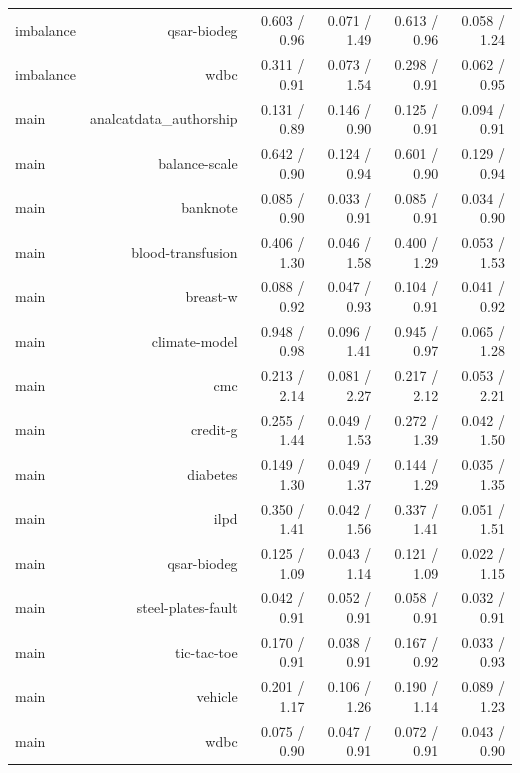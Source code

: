 \begin{table}[t]
\begin{tabular}{lrrrrr}
imbalance & qsar-biodeg & 0.603 / 0.96 & 0.071 / 1.49 & 0.613 / 0.96 & 0.058 / 1.24 \\
imbalance & wdbc & 0.311 / 0.91 & 0.073 / 1.54 & 0.298 / 0.91 & 0.062 / 0.95 \\
main & analcatdata\_authorship & 0.131 / 0.89 & 0.146 / 0.90 & 0.125 / 0.91 & 0.094 / 0.91 \\
main & balance-scale & 0.642 / 0.90 & 0.124 / 0.94 & 0.601 / 0.90 & 0.129 / 0.94 \\
main & banknote & 0.085 / 0.90 & 0.033 / 0.91 & 0.085 / 0.91 & 0.034 / 0.90 \\
main & blood-transfusion & 0.406 / 1.30 & 0.046 / 1.58 & 0.400 / 1.29 & 0.053 / 1.53 \\
main & breast-w & 0.088 / 0.92 & 0.047 / 0.93 & 0.104 / 0.91 & 0.041 / 0.92 \\
main & climate-model & 0.948 / 0.98 & 0.096 / 1.41 & 0.945 / 0.97 & 0.065 / 1.28 \\
main & cmc & 0.213 / 2.14 & 0.081 / 2.27 & 0.217 / 2.12 & 0.053 / 2.21 \\
main & credit-g & 0.255 / 1.44 & 0.049 / 1.53 & 0.272 / 1.39 & 0.042 / 1.50 \\
main & diabetes & 0.149 / 1.30 & 0.049 / 1.37 & 0.144 / 1.29 & 0.035 / 1.35 \\
main & ilpd & 0.350 / 1.41 & 0.042 / 1.56 & 0.337 / 1.41 & 0.051 / 1.51 \\
main & qsar-biodeg & 0.125 / 1.09 & 0.043 / 1.14 & 0.121 / 1.09 & 0.022 / 1.15 \\
main & steel-plates-fault & 0.042 / 0.91 & 0.052 / 0.91 & 0.058 / 0.91 & 0.032 / 0.91 \\
main & tic-tac-toe & 0.170 / 0.91 & 0.038 / 0.91 & 0.167 / 0.92 & 0.033 / 0.93 \\
main & vehicle & 0.201 / 1.17 & 0.106 / 1.26 & 0.190 / 1.14 & 0.089 / 1.23 \\
main & wdbc & 0.075 / 0.90 & 0.047 / 0.91 & 0.072 / 0.91 & 0.043 / 0.90 \\
\bottomrule
\end{tabular}
\end{table}
